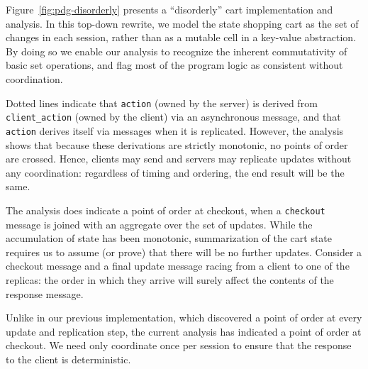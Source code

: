 Figure~\ref{fig:pdg-disorderly} presents a ``disorderly'' cart implementation
and analysis.  In this top-down rewrite, we model the state shopping cart 
as the set of changes in each session, rather than as a mutable cell in a
key-value abstraction.  By doing so we enable our analysis to recognize the
inherent commutativity of basic set operations, and flag most of the 
program logic as consistent without coordination.

Dotted lines indicate that 
\texttt{action} (owned by the server) is derived from \texttt{client\_action} 
(owned by the client) via an asynchronous message, and that \texttt{action} 
derives itself via messages when it is replicated.  However, the analysis
shows that because these derivations are strictly monotonic, no points of
order are crossed.  Hence, clients may send and servers may replicate 
updates without any coordination: regardless of timing and ordering, the end
result will be the same.

The analysis does indicate a point of order at checkout, when a \texttt{checkout}
message is joined with an aggregate over the set of updates.  While the 
accumulation of state has been monotonic, summarization of the cart state
requires us to assume (or prove) that there will be no further updates.
Consider a checkout message and a final update message racing from a client
to one of the replicas: the order in which they arrive will surely affect
the contents of the response message.  

Unlike in our previous implementation, which discovered a point of order at
every update and replication step, the current analysis has indicated
a point of order at checkout.  We need only coordinate once per session to
ensure that the response to the client is deterministic.


